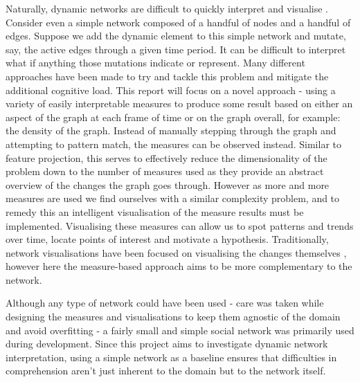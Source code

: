 Naturally, dynamic networks are difficult to quickly interpret and visualise \cite{iddps}. Consider even a simple network composed of a handful of nodes and a handful of edges. Suppose we add the dynamic element to this simple network and mutate, say, the active edges through a given time period. It can be difficult to interpret what if anything those mutations indicate or represent. Many different approaches have been made to try and tackle this problem and mitigate the additional cognitive load. This report will focus on a novel approach - using a variety of easily interpretable measures to produce some result based on either an aspect of the graph at each frame of time or on the graph overall, for example: the density of the graph. Instead of manually stepping through the graph and attempting to pattern match, the measures can be observed instead. Similar to feature projection, this serves to effectively reduce the dimensionality \cite{wikidimred} of the problem down to the number of measures used as they provide an abstract overview of the changes the graph goes through. However as more and more measures are used we find ourselves with a similar complexity problem, and to remedy this an intelligent visualisation of the measure results must be implemented. Visualising these measures can allow us to spot patterns and trends over time, locate points of interest and motivate a hypothesis. Traditionally, network visualisations have been focused on visualising the changes themselves \cite{tsotaivg}, however here the measure-based approach aims to be more complementary to the network.

Although any type of network could have been used - care was taken while designing the measures and visualisations to keep them agnostic of the domain and avoid overfitting - a fairly small and simple social network was primarily used during development. 
Since this project aims to investigate dynamic network interpretation, using a simple network as a baseline ensures that difficulties in comprehension aren’t just inherent to the domain but to the network itself. 

